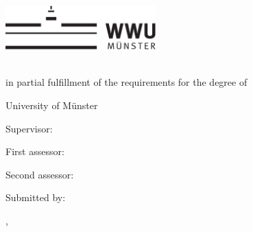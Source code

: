 \thispagestyle{empty}

\begin{center}
    \includegraphics[height=1.7cm]{logos/wwu.pdf}
    \hfill
    \par
    \vspace*{8ex}
    {
        \linespread{0.9}
        \LARGE
        \printtitle
        \par
    }
    \normalsize
    \vspace*{8ex}
    \large
    \textsc{\printtype}\\
    \normalsize
    in partial fulfillment of the requirements for the degree of\\
    \large
    \textsc{\printdegree}
    \par
    \normalsize
    \vspace*{6ex}
    University of Münster\\
    \printinstitute
\end{center}

\par
\vspace*{6ex}
Supervisor:\\
\large
\textit{\printsupervisor}

\par
\normalsize
\vspace*{2ex}
First assessor:\\
\large
\textit{\printfirstassessor}

\par
\normalsize
\vspace*{2ex}
Second assessor:\\
\large
\textit{\printsecondassessor}

\par
\normalsize
\vspace*{2ex}
Submitted by:\\
\large
\textit{\printname}

\par
\normalsize
\vspace*{4ex}
\printcity, \makeatletter
\monthname
\makeatother~\the\year
